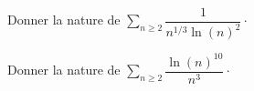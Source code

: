 \documentclass[french,11pt,twoside]{VcCours}
\newcommand{\Sum}[2]{\ensuremath{\textstyle{\sum\limits_{#1}^{#2}}}}
\begin{document}

\begin{exa} Donner la nature de $\Sum{n \geq 2}{} \dfrac{1}{n^{1/3} \ln(n)^2} \cdot$
\end{exa} 

\begin{exa} Donner la nature de $\Sum{n \geq 2}{} \dfrac{\ln(n)^{10}}{n^{3}} \cdot$
\end{exa} 


%
%
%
%
%
%
%
%
%
%
%
\end{document}
